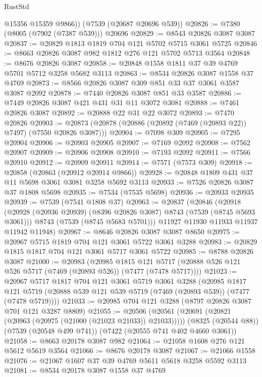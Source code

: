 \begin{lexlean}{RustStd}
\begin{coremodule}
        @15356
        @15359
        @9866))
    (@7539 (@20687 @20696 @539))
@20826 := @7380 (@8005 (@7902 (@7387 @539))) @20696
@20829 := @8543 @20826 @3087 @3087
@20837 := @20829 @1813 @1819 @704 @121 @5702 @5715 @3061 @5725
@20846 := @8663 @20826 @3087 @982 @1812 @276 @121 @5702 @5713 @3564
@20848 := @8676 @20826 @3087
@20858 := @20848 @1558 @1811 @37 @39 @4769 @5701 @5712 @3258 @5682 @3113
@20863 := @8534 @20826 @3087 @1558 @37 @4769
@20873 := @8566 @20826 @3087 @309 @851 @33 @37 @3061 @3587 @3087 @2092
@20878 := @7440 @20826 @3087 @851 @33 @3587
@20886 := @7449 @20826 @3087 @421 @431 @31 @11 @3072 @3081
@20888 := @7461 @20826 @3087
@20892 := @20888 @22 @31 @22 @3072
@20893 := @7470 @20826
@20903 := @20873 (@20878 (@20886 (@20892 (@7469 (@20893 @22)) @7497) (@7550 @20826 @3087)))
@20904 := @7098 @309
@20905 := @7295 @20904
@20906 := @20903 @20905
@20907 := @7169 @2092
@20908 := @7562 @20907
@20909 := @20906 @20908
@20910 := @7193 @2092
@20911 := @7566 @20910
@20912 := @20909 @20911
@20914 := @7571 (@7573 @309)
@20918 := @20858 (@20863 (@20912 @20914 @9866))
@20928 := @20848 @1809 @431 @37 @11 @5698 @3061 @3081 @3258 @5692 @3113
@20933 := @7526 @20826 @3087 @37 @1808 @5698
@20935 := @7534 (@7535 @5698)
@20936 := @20933 @20935
@20939 := @7539 (@7541 @1808 @37)
@20963 := @20837
    (@20846
      (@20918
        (@20928 (@20936 @20939) (@8396 @20826 @3087) @8743 (@7539 (@8745 @5693 @3061)))
        @8743
        (@7539 (@8745 @5683 @5701)))
      @11927
      @11930
      @11933
      @11937
      @11942
      @11948)
@20967 := @8646 @20826 @3087 @3087 @8650
@20975 := @20967 @5715 @1819 @704 @121 @3061 @5722 @3061 @3288
@20983 := @20829 @1815 @1817 @704 @121 @3061 @5717 @3061 @5722
@20985 := @8788 @20826 @3087
@21000 := @20983
    (@20985
      @1815
      @121
      @5717
      (@20888 @526 @121 @526 @5717 (@7469 (@20893 @526)) (@7477 (@7478 @5717))))
@21023 := @20967
    @5717
    @1817
    @704
    @121
    @3061
    @5719
    @3061
    @3288
    (@20985
      @1817
      @121
      @5719
      (@20888 @539 @121 @539 @5719 (@7469 (@20893 @539)) (@7477 (@7478 @5719))))
@21033 := @20985 @704 @121 @3288 (@8797 @20826 @3087 @701 @121 @3287 @8809)
@21055 := @20506
    (@20561 (@20691 (@20821 (@20963 (@20975 (@21000 (@21023 @21033)) @21033)))))
    (@8325 (@20544 @88))
    (@7539 (@20548 @499 @741))
    (@7422 (@20555 @741 @402 @4660 @3061))
@21058 := @8663 @20178 @3087 @982
@21064 := @21058 @1608 @276 @121 @5612 @5619 @3564
@21066 := @8676 @20178 @3087
@21067 := @21066 @1558
@21076 := @21067 @1607 @37 @39 @4769 @5611 @5618 @3258 @5592 @3113
@21081 := @8534 @20178 @3087 @1558 @37 @4769

\end{coremodule}
\end{lexlean}
